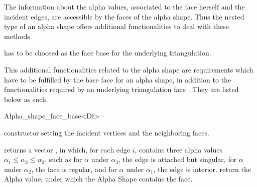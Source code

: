The information about the alpha values, associated to the face herself and the
incident edges, are accessible by the 
faces of the alpha shape. Thus the nested 
type of an alpha shape offers additional functionalities to deal with these
methods.

 has to be choosed as the face base for the underlying triangulation. 

This additional functionalities related to the alpha shape
are requirements which have to be fulfilled
by the base face  for an alpha shape,
in addition to the functionalities required by an underlying triangulation face .
They are listed below as such.

\ccInheritsFrom


\begin{ccClass}{Alpha_shape_face_base<Df>}

\ccTypes



\ccCreation

\begin{ccAdvanced}

\ccGlue
{}
\ccGlue
{} 
{constructor setting the incident vertices and the neighboring faces.}

\end{ccAdvanced}

{returns a vector , in which, for each edge $i$,  contains
three alpha values
 $\alpha_1 \leq \alpha_2 \leq \alpha_3$, such as for
$\alpha$ under $\alpha_3$, the edge is attached but singular,
for $\alpha$ under $\alpha_2$, the face is regular, and for $\alpha$
under $\alpha_1$, the edge is interior.}
{return the Alpha value, under which the Alpha Shape contains the
face.}


\end{ccClass}
